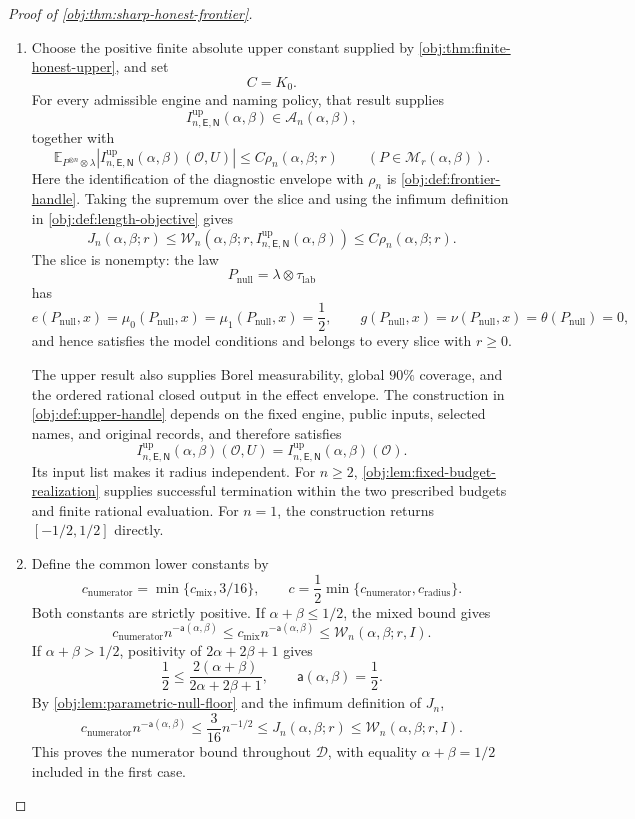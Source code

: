 \documentclass[11pt]{article}
\begin{document}
\begin{proof}[Proof of \cref{obj:thm:sharp-honest-frontier}]
\begin{enumerate}
\item Choose the positive finite absolute upper constant supplied by
\cref{obj:thm:finite-honest-upper}, and set
\[
C=K_0.
\]
For every admissible engine and naming policy, that result supplies
\[
I^{\mathrm{up}}_{n,\mathsf E,\mathsf N}(\alpha,\beta)
\in\mathcal A_n(\alpha,\beta),
\]
together with
\[
\mathbb E_{P^{\otimes n}\otimes\lambda}
\left|I^{\mathrm{up}}_{n,\mathsf E,\mathsf N}(\alpha,\beta)(\mathcal O,U)\right|
\le C\rho_n(\alpha,\beta;r)
\qquad(P\in\mathcal M_r(\alpha,\beta)).
\]
Here the identification of the diagnostic envelope with \(\rho_n\) is
\cref{obj:def:frontier-handle}. Taking the supremum over the slice and using
the infimum definition in \cref{obj:def:length-objective} gives
\[
J_n(\alpha,\beta;r)
\le
\mathcal W_n\!\left(
\alpha,\beta;r,I^{\mathrm{up}}_{n,\mathsf E,\mathsf N}(\alpha,\beta)
\right)
\le C\rho_n(\alpha,\beta;r).
\]
The slice is nonempty: the law
\[
P_{\mathrm{null}}=\lambda\otimes\tau_{\mathrm{lab}}
\]
has
\[
e(P_{\mathrm{null}},x)=\mu_0(P_{\mathrm{null}},x)
=\mu_1(P_{\mathrm{null}},x)=\frac12,
\qquad
g(P_{\mathrm{null}},x)=\nu(P_{\mathrm{null}},x)
=\theta(P_{\mathrm{null}})=0,
\]
and hence satisfies the model conditions and belongs to every slice with
\(r\ge0\).

The upper result also supplies Borel measurability, global \(90\%\) coverage,
and the ordered rational closed output in the effect envelope. The
construction in \cref{obj:def:upper-handle} depends on the fixed engine,
public inputs, selected names, and original records, and therefore satisfies
\[
I^{\mathrm{up}}_{n,\mathsf E,\mathsf N}(\alpha,\beta)(\mathcal O,U)
=
I^{\mathrm{up}}_{n,\mathsf E,\mathsf N}(\alpha,\beta)(\mathcal O).
\]
Its input list makes it radius independent. For \(n\ge2\),
\cref{obj:lem:fixed-budget-realization} supplies successful termination
within the two prescribed budgets and finite rational evaluation. For
\(n=1\), the construction returns \([-1/2,1/2]\) directly.

\item Define the common lower constants by
\[
c_{\mathrm{numerator}}
=\min\{c_{\mathrm{mix}},3/16\},
\qquad
c=\frac12\min\{c_{\mathrm{numerator}},c_{\mathrm{radius}}\}.
\]
Both constants are strictly positive. If \(\alpha+\beta\le1/2\), the mixed
bound gives
\[
c_{\mathrm{numerator}}n^{-\mathsf a(\alpha,\beta)}
\le
c_{\mathrm{mix}}n^{-\mathsf a(\alpha,\beta)}
\le\mathcal W_n(\alpha,\beta;r,I).
\]
If \(\alpha+\beta>1/2\), positivity of \(2\alpha+2\beta+1\) gives
\[
\frac12\le\frac{2(\alpha+\beta)}{2\alpha+2\beta+1},
\qquad
\mathsf a(\alpha,\beta)=\frac12.
\]
By \cref{obj:lem:parametric-null-floor} and the infimum definition of \(J_n\),
\[
c_{\mathrm{numerator}}n^{-\mathsf a(\alpha,\beta)}
\le
\frac3{16}n^{-1/2}
\le J_n(\alpha,\beta;r)
\le\mathcal W_n(\alpha,\beta;r,I).
\]
This proves the numerator bound throughout \(\mathcal D\), with equality
\(\alpha+\beta=1/2\) included in the first case.


\end{enumerate}
\end{proof}
\end{document}
